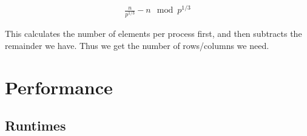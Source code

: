 \documentclass[a4paper,11pt,oneside]{book}
\begin{document}
\begin{align*}
    \frac{n}{p^{1/3}} - n \mod p^{1/3}
\end{align*}

This calculates the number of elements per process first, and then subtracts the remainder we have. Thus we get the number of rows/columns we need.

\chapter{Performance}
\section{Runtimes}



\end{document}
